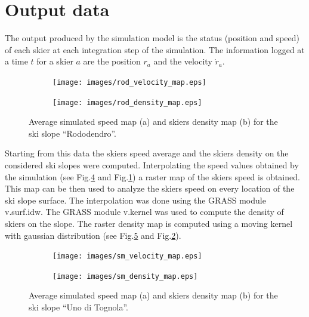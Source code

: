 \documentclass[12pt,a4paper,twoside]{book}
\begin{document}
\section{Output data}\label{output_data}
The output produced by the simulation model is the status (position and speed) of each skier at each integration step of the simulation. The information logged at a time $t$ for a skier $a$ are the position $r_a$ and the velocity $\dot{r}_a$.

\begin{figure}
        \centering
        \begin{subfigure}[b]{\textwidth}
                \centering
                \texttt{[image: images/rod\_velocity\_map.eps]}
                \caption{}\label{rododendro_vel}
        \end{subfigure}%

        \begin{subfigure}[b]{\textwidth}
                \centering
                \texttt{[image: images/rod\_density\_map.eps]}
                \caption{}\label{rododendro_den}
        \end{subfigure}
        \caption{Average simulated speed map (a) and skiers density map (b) for the ski slope ``Rododendro''.}\label{rododendro}
\end{figure}

Starting from this data the skiers speed average and the skiers density on the considered ski slopes were computed. Interpolating the speed values obtained by the simulation (see Fig.\ref{uno_tognola_vel} and Fig.\ref{rododendro_vel}) a raster map of the skiers speed is obtained. This map can be then used to analyze the skiers speed on every location of the ski slope surface. The interpolation was done using the GRASS module v.surf.idw. The GRASS module v.kernel was used to compute the density of skiers on the slope. The raster density map is computed using a moving kernel with gaussian distribution (see Fig.\ref{uno_tognola_den} and Fig.\ref{rododendro_den}).

\begin{figure}
        \centering
        \begin{subfigure}[b]{\textwidth}
                \centering
                \texttt{[image: images/sm\_velocity\_map.eps]}
                \caption{}\label{uno_tognola_vel}
        \end{subfigure}%

        \begin{subfigure}[b]{\textwidth}
                \centering
                \texttt{[image: images/sm\_density\_map.eps]}
                \caption{}\label{uno_tognola_den}
        \end{subfigure}
        \caption{Average simulated speed map (a) and skiers density map (b) for the ski slope ``Uno di Tognola''.}\label{uno_tognola}
\end{figure}
\end{document}
